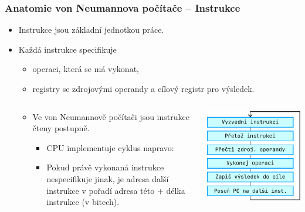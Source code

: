 \documentclass[aspectratio=169,11pt,svgnames]{beamer}
\begin{document}
\begin{frame}
 \frametitle{Anatomie von Neumannova počítače -- Instrukce}
 \begin{itemize}[label=\textbullet]
  \item Instrukce jsou základní jednotkou práce.\pause
  \item Každá instrukce specifikuje
  \begin{itemize}[label=\textemdash]
   \item \alert{operaci}, která se má vykonat,\pause
   \item registry se zdrojovými \alert{operandy} a \alert{cílový registr} pro
    výsledek.
  \end{itemize}
  \begin{columns}[T]
   \begin{column}{.65\textwidth}
    \begin{itemize}[label=\textbullet]
     \item Ve von Neumannově počítači jsou instrukce čteny postupně.\pause
     \begin{itemize}[label=\textemdash]
      \item CPU implementuje cyklus napravo:
      \item Pokud právě vykonaná instrukce nespecifikuje jinak, je adresa další
       instrukce v pořadí adresa této + délka instrukce (v bitech).
     \end{itemize}
    \end{itemize}
   \end{column}
   \begin{column}{.29\textwidth}
    \begin{center}
     \includegraphics[width=\textwidth]{instruction-reading.pdf}
    \end{center}
   \end{column}
  \end{columns}
 \end{itemize}
\end{frame}
\end{document}
